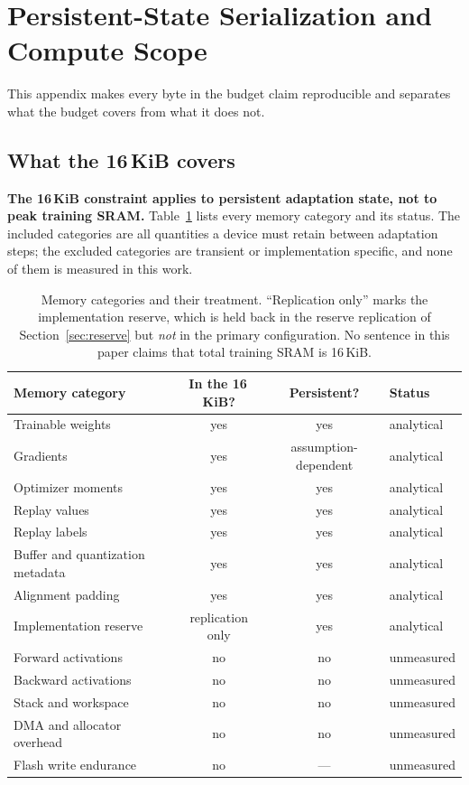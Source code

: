\section{Persistent-State Serialization and Compute Scope}
\label{sec:embedded}

This appendix makes every byte in the budget claim reproducible and separates
what the budget covers from what it does not.

\subsection{What the 16\,KiB covers}

\textbf{The 16\,KiB constraint applies to persistent adaptation state, not to
peak training SRAM.} Table~\ref{tab:memcats} lists every memory category and its
status. The included categories are all quantities a device must retain between
adaptation steps; the excluded categories are transient or implementation
specific, and none of them is measured in this work.

\begin{table}[H]
\centering
\small
\caption{Memory categories and their treatment. ``Replication only'' marks the
implementation reserve, which is held back in the reserve replication of
Section~\ref{sec:reserve} but \emph{not} in the primary configuration. No
sentence in this paper claims that total training SRAM is 16\,KiB.}
\label{tab:memcats}
\begin{tabular}{lccl}
\toprule
Memory category & In the 16\,KiB? & Persistent? & Status \\
\midrule
Trainable weights          & yes & yes & analytical \\
Gradients                  & yes & assumption-dependent & analytical \\
Optimizer moments          & yes & yes & analytical \\
Replay values              & yes & yes & analytical \\
Replay labels              & yes & yes & analytical \\
Buffer and quantization metadata & yes & yes & analytical \\
Alignment padding          & yes & yes & analytical \\
Implementation reserve     & replication only & yes & analytical \\
\midrule
Forward activations        & no  & no  & unmeasured \\
Backward activations       & no  & no  & unmeasured \\
Stack and workspace        & no  & no  & unmeasured \\
DMA and allocator overhead & no  & no  & unmeasured \\
Flash write endurance      & no  & --- & unmeasured \\
\bottomrule
\end{tabular}
\end{table}

